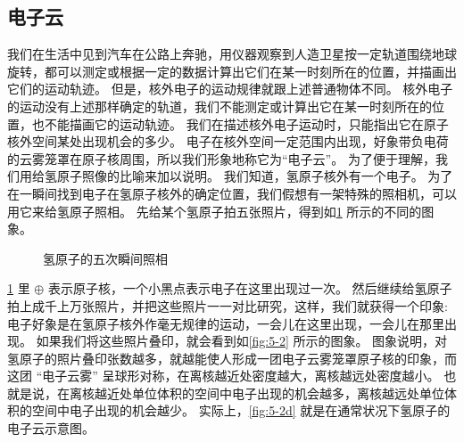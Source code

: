 \subsection{电子云}
我们在生活中见到汽车在公路上奔驰，用仪器观察到人造卫星按一定轨道围绕地球旋转，都可以测定或根据一定的数据计算出它们在某一时刻所在的位置，并描画出它们的运动轨迹。
但是，核外电子的运动规律就跟上述普通物体不同。
核外电子的运动没有上述那样确定的轨道，我们不能测定或计算出它在某一时刻所在的位置，也不能描画它的运动轨迹。
我们在描述核外电子运动时，只能指出它在原子核外空间某处出现机会的多少。
电子在核外空间一定范围内出现，好象带负电荷的云雾笼罩在原子核周围，所以我们形象地称它为“电子云”。
为了便于理解，我们用给氢原子照像的比喻来加以说明。
我们知道，氢原子核外有一个电子。
为了在一瞬间找到电子在氢原子核外的确定位置，我们假想有一架特殊的照相机，可以用它来给氢原子照相。
先给某个氢原子拍五张照片，得到如\cref{fig:5-1} 所示的不同的图象。
\begin{figure}
  \begin{minipage}{0.19\linewidth}\centering
    \subcaption{}\label{fig:5-1a}
  \end{minipage}
  \begin{minipage}{0.19\linewidth}\centering
    \subcaption{}\label{fig:5-1b}
  \end{minipage}
  \begin{minipage}{0.19\linewidth}\centering
    \subcaption{}\label{fig:5-1c}
  \end{minipage}
  \begin{minipage}{0.19\linewidth}\centering
    \subcaption{}\label{fig:5-1d}
  \end{minipage}
  \begin{minipage}{0.19\linewidth}\centering
    \subcaption{}\label{fig:5-1e}
  \end{minipage}
  \caption{氢原子的五次瞬间照相}\label{fig:5-1}
\end{figure}
\cref{fig:5-1} 里 $\oplus$ 表示原子核，一个小黑点表示电子在这里出现过一次。
然后继续给氢原子拍上成千上万张照片，并把这些照片一一对比研究，这样，我们就获得一个印象: 电子好象是在氢原子核外作毫无规律的运动，一会儿在这里出现，一会儿在那里出现。
如果我们将这些照片叠印，就会看到如\cref{fig:5-2} 所示的图象。
图象说明，对氢原子的照片叠印张数越多，就越能使人形成一团电子云雾笼罩原子核的印象，而这团 “电子云雾” 呈球形对称，在离核越近处密度越大，离核越远处密度越小。
也就是说，在离核越近处单位体积的空间中电子出现的机会越多，离核越远处单位体积的空间中电子出现的机会越少。
实际上，\cref{fig:5-2d} 就是在通常状况下氢原子的电子云示意图。

